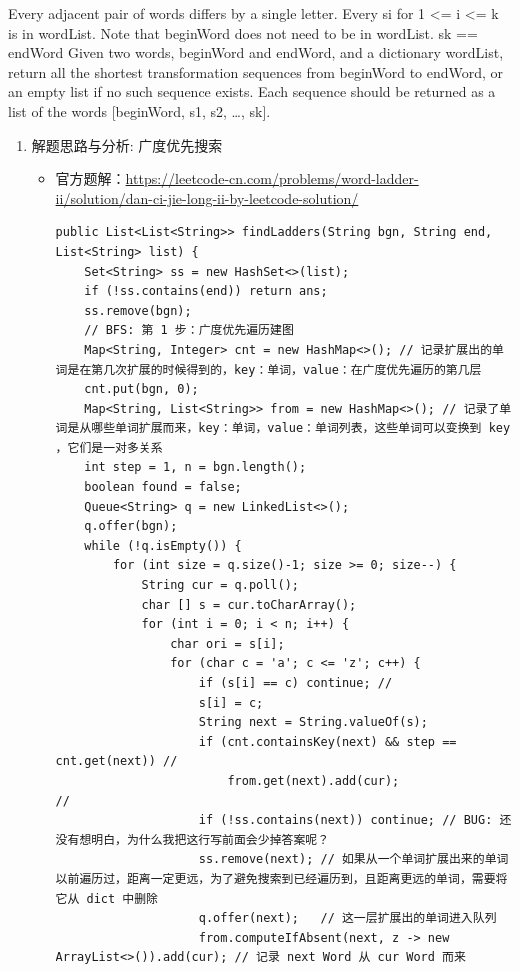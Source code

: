 \documentclass[9pt, b5paaper]{book}
\begin{document}
Every adjacent pair of words differs by a single letter.
Every si for 1 <= i <= k is in wordList. Note that beginWord does not need to be in wordList.
sk == endWord
Given two words, beginWord and endWord, and a dictionary wordList, return all the shortest transformation sequences from beginWord to endWord, or an empty list if no such sequence exists. Each sequence should be returned as a list of the words [beginWord, s1, s2, \ldots{}, sk].
\begin{enumerate}
\item 解题思路与分析: 广度优先搜索
\label{sec-1-6-2-1}
\begin{itemize}
\item 官方题解：\url{https://leetcode-cn.com/problems/word-ladder-ii/solution/dan-ci-jie-long-ii-by-leetcode-solution/}

\begin{verbatim}
public List<List<String>> findLadders(String bgn, String end, List<String> list) { 
    Set<String> ss = new HashSet<>(list);
    if (!ss.contains(end)) return ans;
    ss.remove(bgn);
    // BFS: 第 1 步：广度优先遍历建图
    Map<String, Integer> cnt = new HashMap<>(); // 记录扩展出的单词是在第几次扩展的时候得到的，key：单词，value：在广度优先遍历的第几层
    cnt.put(bgn, 0);
    Map<String, List<String>> from = new HashMap<>(); // 记录了单词是从哪些单词扩展而来，key：单词，value：单词列表，这些单词可以变换到 key ，它们是一对多关系
    int step = 1, n = bgn.length();
    boolean found = false;
    Queue<String> q = new LinkedList<>();
    q.offer(bgn);
    while (!q.isEmpty()) {
        for (int size = q.size()-1; size >= 0; size--) {
            String cur = q.poll();
            char [] s = cur.toCharArray();
            for (int i = 0; i < n; i++) {
                char ori = s[i];
                for (char c = 'a'; c <= 'z'; c++) {
                    if (s[i] == c) continue; // 
                    s[i] = c;
                    String next = String.valueOf(s);
                    if (cnt.containsKey(next) && step == cnt.get(next)) //
                        from.get(next).add(cur);                        //
                    if (!ss.contains(next)) continue; // BUG: 还没有想明白，为什么我把这行写前面会少掉答案呢？ 
                    ss.remove(next); // 如果从一个单词扩展出来的单词以前遍历过，距离一定更远，为了避免搜索到已经遍历到，且距离更远的单词，需要将它从 dict 中删除
                    q.offer(next);   // 这一层扩展出的单词进入队列
                    from.computeIfAbsent(next, z -> new ArrayList<>()).add(cur); // 记录 next Word 从 cur Word 而来

\end{verbatim}
\end{itemize}
\end{enumerate}
\end{document}
